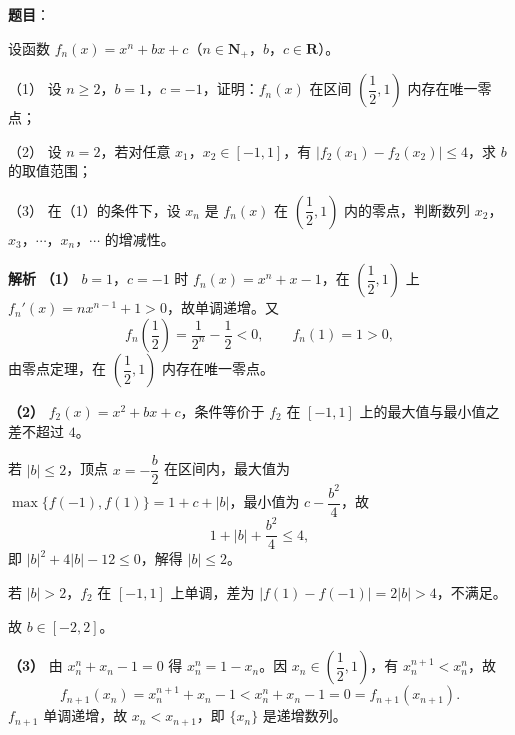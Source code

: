 \begin{answer}

\textbf{题目}：

设函数 $f_n(x)=x^n+bx+c$（$n\in\mathbf N_+$，$b$，$c\in\mathbf R$）。

（1） 设 $n\geqslant2$，$b=1$，$c=-1$，证明：$f_n(x)$ 在区间 $\left(\dfrac12,1\right)$ 内存在唯一零点；

（2） 设 $n=2$，若对任意 $x_1$，$x_2\in[-1,1]$，有 $|f_2(x_1)-f_2(x_2)|\leqslant4$，求 $b$ 的取值范围；

（3） 在（1）的条件下，设 $x_n$ 是 $f_n(x)$ 在 $\left(\dfrac12,1\right)$ 内的零点，判断数列 $x_2$，$x_3$，$\cdots$，$x_n$，$\cdots$ 的增减性。

\textbf{解析}
\textbf{（1）} $b=1$，$c=-1$ 时 $f_n(x)=x^n+x-1$，在 $\left(\dfrac12,1\right)$ 上 $f_n'(x)=nx^{n-1}+1>0$，故单调递增。又
\nopagebreak[4]
\[f_n\left(\frac12\right)=\frac1{2^n}-\frac12<0,\qquad f_n(1)=1>0,\]
由零点定理，在 $\left(\dfrac12,1\right)$ 内存在唯一零点。

\textbf{（2）} $f_2(x)=x^2+bx+c$，条件等价于 $f_2$ 在 $[-1,1]$ 上的最大值与最小值之差不超过 $4$。

若 $|b|\leqslant2$，顶点 $x=-\dfrac b2$ 在区间内，最大值为 $\max\{f(-1),f(1)\}=1+c+|b|$，最小值为 $c-\dfrac{b^2}4$，故
\nopagebreak[4]
\[1+|b|+\frac{b^2}4\leqslant4,\]
即 $|b|^2+4|b|-12\leqslant0$，解得 $|b|\leqslant2$。

若 $|b|>2$，$f_2$ 在 $[-1,1]$ 上单调，差为 $|f(1)-f(-1)|=2|b|>4$，不满足。

故 $b\in[-2,2]$。

\textbf{（3）} 由 $x_n^n+x_n-1=0$ 得 $x_n^n=1-x_n$。因 $x_n\in\left(\dfrac12,1\right)$，有 $x_n^{n+1}<x_n^n$，故
\nopagebreak[4]
\[f_{n+1}(x_n)=x_n^{n+1}+x_n-1<x_n^n+x_n-1=0=f_{n+1}(x_{n+1}).\]
$f_{n+1}$ 单调递增，故 $x_n<x_{n+1}$，即 $\{x_n\}$ 是递增数列。




\end{answer}